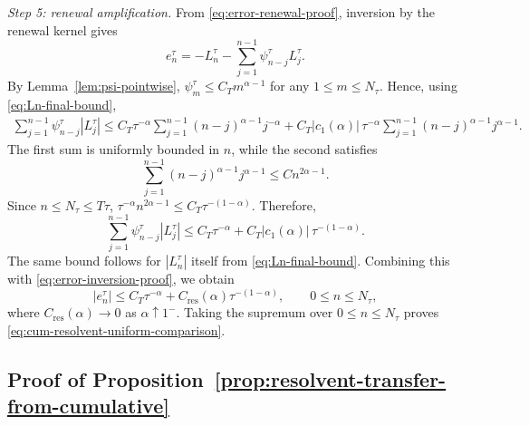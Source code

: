 \documentclass[letterpaper]{article}
\numberwithin{equation}{section}
\theoremstyle{definition}
\theoremstyle{remark}
\begin{document}
\medskip
\noindent
\textit{Step 5: renewal amplification.}
From \eqref{eq:error-renewal-proof}, inversion by the renewal kernel gives
\begin{equation}\label{eq:error-inversion-proof}
  e_n^\tau
  =
  -L_n^\tau-\sum_{j=1}^{n-1}\psi_{n-j}^\tau L_j^\tau.
\end{equation}
By Lemma~\ref{lem:psi-pointwise},
$\psi_m^\tau\le C_T m^{\alpha-1}$
for any $1\le m\le N_\tau$.
Hence, using \eqref{eq:Ln-final-bound},
\begin{align*}
  \sum_{j=1}^{n-1}\psi_{n-j}^\tau |L_j^\tau|
  \le
  C_T\tau^{-\alpha}
  \sum_{j=1}^{n-1}(n-j)^{\alpha-1}j^{-\alpha}
  +
  C_T|c_1(\alpha)|\,\tau^{-\alpha}
  \sum_{j=1}^{n-1}(n-j)^{\alpha-1}j^{\alpha-1}.
\end{align*}
The first sum is uniformly bounded in $n$, while the second satisfies
\[
  \sum_{j=1}^{n-1}(n-j)^{\alpha-1}j^{\alpha-1}
  \le C n^{2\alpha-1}.
\]
Since $n\le N_\tau\le T\tau$,
$\tau^{-\alpha}n^{2\alpha-1}\le C_T\tau^{-(1-\alpha)}$.
Therefore,
\[
  \sum_{j=1}^{n-1}\psi_{n-j}^\tau |L_j^\tau|
  \le
  C_T\tau^{-\alpha}
  +
  C_T|c_1(\alpha)|\,\tau^{-(1-\alpha)}.
\]
The same bound follows for $|L_n^\tau|$ itself from \eqref{eq:Ln-final-bound}. Combining this with \eqref{eq:error-inversion-proof}, we obtain
\[
  |e_n^\tau|
  \le
  C_T\tau^{-\alpha}
  +
  C_{\mathrm{res}}(\alpha)\tau^{-(1-\alpha)},
  \qquad 0\le n\le N_\tau,
\]
where
$C_{\mathrm{res}}(\alpha)\to0$
as $\alpha\uparrow1^-$.
Taking the supremum over $0\le n\le N_\tau$ proves
\eqref{eq:cum-resolvent-uniform-comparison}.


\subsection{Proof of Proposition~\ref{prop:resolvent-transfer-from-cumulative}}\label{app:proof-resolvent-transfer-from-cumulative}
\end{document}
